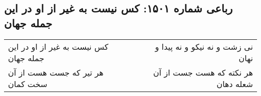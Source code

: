 \begin{center}
\section*{رباعی شماره ۱۵۰۱: کس نیست به غیر از او در این جمله جهان}
\label{sec:1501}
\begin{longtable}{l p{0.5cm} r}
کس نیست به غیر از او در این جمله جهان
&&
نی زشت و نه نیکو و نه پیدا و نهان
\\
هر تیر که جست هست از آن سخت کمان
&&
هر نکته که هست جست از آن شعله دهان
\\
\end{longtable}
\end{center}
